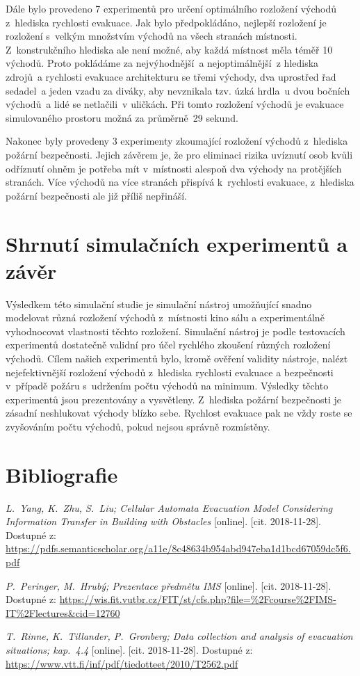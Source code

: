\documentclass[11pt, titlepage, a4paper]{article}
\begin{document}
    Dále bylo provedeno 7 experimentů pro určení optimálního rozložení východů z~hlediska rychlosti evakuace. Jak bylo předpokládáno, nejlepší rozložení je rozložení s~velkým množstvím východů na všech stranách místnosti. Z~konstrukčního hlediska ale není možné, aby každá místnost měla téměř 10 východů. Proto pokládáme za nejvýhodnější~a nejoptimálnější~z hlediska zdrojů~a rychlosti evakuace architekturu se třemi východy, dva uprostřed řad sedadel~a jeden vzadu za diváky, aby nevznikala tzv. úzká hrdla~u dvou bočních východů~a lidé se netlačili~v uličkách. Při tomto rozložení východů je evakuace simulovaného prostoru možná za průměrně~29 sekund.

    Nakonec byly provedeny 3 experimenty zkoumající rozložení východů z~hlediska požární bezpečnosti. Jejich závěrem je, že pro eliminaci rizika uvíznutí osob kvůli odříznutí ohněm je potřeba mít v~místnosti alespoň dva východy na protějších stranách. Více východů na více stranách přispívá k~rychlosti evakuace, z~hlediska požární bezpečnosti ale již příliš nepřináší.

     

\section{Shrnutí simulačních experimentů a závěr}
    Výsledkem této simulační studie je simulační nástroj umožňující snadno modelovat různá rozložení východů z~místnosti kino sálu a experimentálně vyhodnocovat vlastnosti těchto rozložení. Simulační nástroj je podle testovacích experimentů dostatečně validní pro účel rychlého zkoušení různých rozložení východů. Cílem našich experimentů bylo, kromě ověření validity nástroje, nalézt nejefektivnější rozložení východů z~hlediska rychlosti evakuace a bezpečnosti v~případě požáru s~udržením počtu východů na minimum. Výsledky těchto experimentů jsou prezentovány a vysvětleny. Z~hlediska požární bezpečnosti je zásadní neshlukovat východy blízko sebe. Rychlost evakuace pak ne vždy roste se zvyšováním počtu východů, pokud nejsou správně rozmístěny.

\section{Bibliografie}

\begin{thebibliography}{2}
        
\textit{L.~Yang, K.~Zhu, S.~Liu; Cellular Automata Evacuation Model Considering Information Transfer in Building with Obstacles} [online]. [cit. 2018-11-28]. Dostupné z: \url{https://pdfs.semanticscholar.org/a11e/8c48634b954abd947eba1d1bcd67059dc5f6.pdf}

\textit{P.~Peringer, M.~Hrubý; Prezentace předmětu IMS} [online]. [cit. 2018-11-28]. Dostupné z: \url{https://wis.fit.vutbr.cz/FIT/st/cfs.php?file=\%2Fcourse\%2FIMS-IT\%2Flectures&cid=12760}

\textit{T.~Rinne, K.~Tillander, P.~Gronberg; Data collection and analysis of evacuation situations; kap.~4.4} [online]. [cit. 2018-11-28]. Dostupné z: \url{https://www.vtt.fi/inf/pdf/tiedotteet/2010/T2562.pdf}

\end{thebibliography}
        
\end{document}
